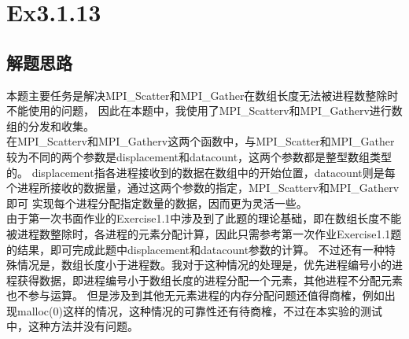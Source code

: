 \documentclass[UTF8]{article}
\begin{document}






\newpage


\section{Ex3.1.13}
\subsection{解题思路}
本题主要任务是解决MPI\_Scatter和MPI\_Gather在数组长度无法被进程数整除时不能使用的问题，
因此在本题中，我使用了MPI\_Scatterv和MPI\_Gatherv进行数组的分发和收集。\\


在MPI\_Scatterv和MPI\_Gatherv这两个函数中，与MPI\_Scatter和MPI\_Gather较为不同的两个参数是displacement和datacount，这两个参数都是整型数组类型的。
displacement指各进程接收到的数据在数组中的开始位置，datacount则是每个进程所接收的数据量，通过这两个参数的指定，MPI\_Scatterv和MPI\_Gatherv即可
实现每个进程分配指定数量的数据，因而更为灵活一些。 \\


由于第一次书面作业的Exercise1.1中涉及到了此题的理论基础，即在数组长度不能被进程数整除时，各进程的元素分配计算，因此只需参考第一次作业Exercise1.1题的结果，即可完成此题中displacement和datacount参数的计算。
不过还有一种特殊情况是，数组长度小于进程数。我对于这种情况的处理是，优先进程编号小的进程获得数据，即进程编号小于数组长度的进程分配一个元素，其他进程不分配元素也不参与运算。
但是涉及到其他无元素进程的内存分配问题还值得商榷，例如出现malloc(0)这样的情况，这种情况的可靠性还有待商榷，不过在本实验的测试中，这种方法并没有问题。
\end{document}
